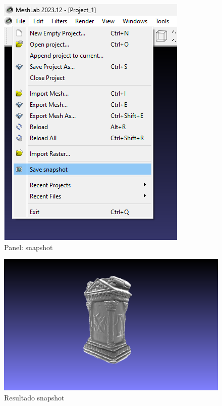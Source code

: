 \documentclass{article}
\begin{document}
\begin{figure}[H]
    \centering
    \includegraphics[scale=0.65]{images/snap_02.png}
    \caption{Panel: snapshot}
\end{figure}

\begin{figure}[H]
    \centering
    \includegraphics[scale=0.25]{images/snap_03.png}
    \caption{Resultado snapshot}
\end{figure}
\end{document}
